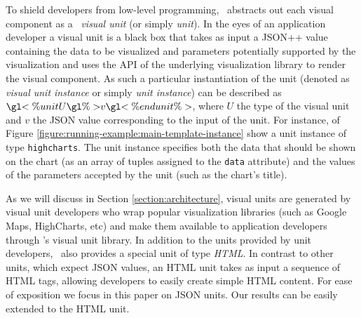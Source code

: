 \noindent To shield developers from low-level programming, \projname\ abstracts out each visual component as a \projname\ \emph{visual unit} (or simply \emph{unit}). In the eyes of an application developer a visual unit is a black box that takes as input a JSON++ value containing the data to be visualized and parameters potentially supported by the visualization and uses the API of the underlying visualization library to render the visual component. As such a particular instantiation of the unit (denoted as \emph{visual unit instance} or simply \emph{unit instance}) can be described as $\gl{<\% unit } U \gl{ \%> } v \gl{ <\% end unit \%>}$, where $U$ the type of the visual unit and $v$ the JSON value corresponding to the input of the unit. For instance,  of Figure \ref{figure:running-example:main-template-instance} show a unit instance of type \texttt{highcharts}. The unit instance specifies both the data that should be shown on the chart (as an array of tuples assigned to the \texttt{data} attribute) and the values of the parameters accepted by the unit (such as the chart's title).


As we will discuss in Section \ref{section:architecture}, visual units are generated by visual unit developers who wrap popular visualization libraries (such as Google Maps, HighCharts, etc) and make them available to application developers through \projname's visual unit library. In addition to the units provided by unit developers, \projname\ also provides a special unit of type \emph{HTML}. In contrast to other units, which expect JSON values, an HTML unit takes as input a sequence of HTML tags, allowing developers to easily create simple HTML content. For ease of exposition we focus in this paper on JSON units. Our results can be easily extended to the HTML unit. 

